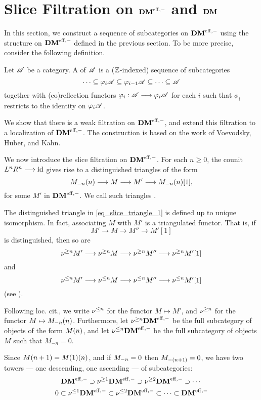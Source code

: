 \newpage
\section{Slice Filtration on $\DMeff$ and $\DM$}\label{sect_slice_filt_dm}

In this section, we construct a sequence of subcategories on 
$\DMeff$ using the structure on $\DMeff$ defined in the previous
section. To be more precise, consider the following definition.

\begin{defn}\label{def_cat_filtration}
Let $\Cat{A}$ be a category. A  of $\Cat{A}$ 
is a ($\Z$-indexed) sequence of subcategories
\[
\cdots \subseteq \phi_i\Cat{A} \subseteq \phi_{i - 1}\Cat{A} 
   \subseteq \cdots \subseteq \Cat{A}
\]
together with (co)reflection functors $\phi_i: \Cat{A} \to 
\phi_i\Cat{A}$ for each $i$ such that $\phi_i$ restricts to 
the identity on $\phi_i\Cat{A}$.
\end{defn}

We show that there is a weak filtration on $\DMeff$, and extend 
this filtration to a localization of $\DMeff$. The construction
is based on the work of Voevodsky, Huber, and Kahn.

We now introduce the slice filtration on $\DMeff$. For each 
$n \geq 0$, the counit $\LDMf{n}\RDMf{n} \to \id$ gives rise to a 
distinguished triangles of the form
\begin{equation}\label{eq_slice_triangle_1}
\tZ[n]{\hZ[n]{M}} \to M \to M' \to \tZ[n]{\hZ[n]{M}}[1],
\end{equation}
for some $M'$ in $\DMeff$. We call such triangles .

The distinguished triangle in \eqref{eq_slice_triangle_1} is 
defined up to unique isomorphism. In fact, associating $M$ with $M'$ is a triangulated 
functor. That is, if
\[
M' \to M \to M'' \to M'[1]
\]
is distinguished, then so are
\[
\sgDM{n}M' \to \sgDM{n}M \to \sgDM{n}M'' \to \sgDM{n}M'[1]
\]
and
\[
\slDM{n}M' \to \slDM{n}M \to \slDM{n}M'' \to \slDM{n}M'[1]
\]
(see \cite[1.4]{HuKa}).

Following loc. cit., we write $\slDM{n}$ for the functor $M 
\mapsto M'$, and $\sgDM{n}$ for the functor $M \mapsto 
\tZ[n]{\hZ[n]{M}}$. Furthermore, let $\sgDM{n}\DMeff$ be the full
subcategory of objects of the form $\tZ[n]{M}$, and let 
$\slDM{n} \DMeff$ be the full subcategory of objects $M$ such 
that $M_{-n} = 0$.

Since $\tZ[n + 1]{M} = \tZ[n]{\tZ[1]{M}}$, and if $\hZ[n]{M} = 0$
then $\hZ[(n + 1)]{M} = 0$, we have two towers --- one descending, one 
ascending --- of subcategories:
\begin{equation}
\DMeff \supset \sgDM{1}\DMeff \supset \sgDM{2}\DMeff \supset \cdots \\
\end{equation}
\vskip 5pt
\begin{equation}
0 \subset \slDM{1}\DMeff \subset \slDM{2}\DMeff \subset \cdots \subset
\DMeff
\end{equation}

